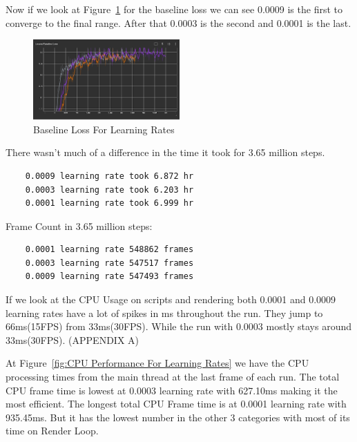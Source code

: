 \documentclass{LSkill}
\begin{document}
Now if we look at Figure~\ref{fig:Baseline Loss For Learning Rates} for the baseline loss we can see 0.0009 is the first to converge to the final range. After that 0.0003 is the second and 0.0001 is the last.

\begin{figure}[htbp]
    \centering
    \includegraphics[width=0.5\textwidth]{figure 4.png} 
    \caption{Baseline Loss For Learning Rates}
    \label{fig:Baseline Loss For Learning Rates}
\end{figure}
\vspace{1cm}

There wasn’t much of a difference in the time it took for 3.65 million steps. 

\begin{verbatim}
	0.0009 learning rate took 6.872 hr
	0.0003 learning rate took 6.203 hr
	0.0001 learning rate took 6.999 hr
\end{verbatim}

	Frame Count in 3.65 million steps:

\begin{verbatim}
	0.0001 learning rate 548862 frames
	0.0003 learning rate 547517 frames
	0.0009 learning rate 547493 frames
\end{verbatim}

If we look at the CPU Usage on scripts and rendering both 0.0001 and 0.0009 learning rates have a lot of spikes in ms throughout the run. They jump to 66ms(15FPS) from 33ms(30FPS). While the run with 0.0003 mostly stays around 33ms(30FPS).
(APPENDIX A)
\vspace{0.5cm}

At Figure~\ref{fig:CPU Performance For Learning Rates} we have the CPU processing times from the main thread at the last frame of each run. The total CPU frame time is lowest at 0.0003 learning rate with 627.10ms making it the most efficient. The longest total CPU Frame time is at 0.0001 learning rate with 935.45ms. But it has the lowest number in the other 3 categories with most of its time on Render Loop.
\end{document}
